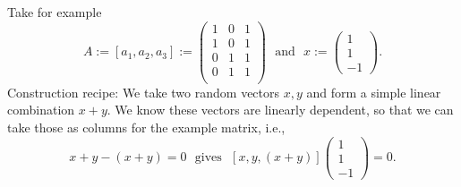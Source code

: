 {
\color{solution}
Take for example 
$$
A := [a_1, a_2, a_3] := \begin{pmatrix}
	  1 & 0 &1\\
	  1 & 0 &1\\
	  0 & 1 &1\\
	  0 & 1 &1 \\
\end{pmatrix}
~~~\text{and}~~~
x := \begin{pmatrix}
1\\1\\-1
\end{pmatrix}.
$$
Construction recipe: We take two random vectors $x, y$ and form a simple linear combination $x+y$. We know these vectors are linearly dependent, so that we can take those as columns for the example matrix, i.e.,
$$x + y - (x+y) = 0 ~~~\text{gives}~~~[x, y, (x+y)] \begin{pmatrix}
1\\1\\-1
\end{pmatrix} = 0.$$
}
